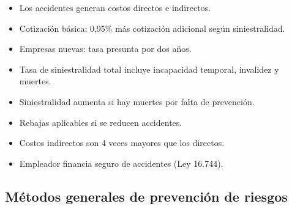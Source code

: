 \documentclass{article} %
\begin{document}
\begin{itemize}[label={},left=0pt,align=parleft]
    \item \begin{highlightbox}[levelone] Los accidentes generan costos directos e indirectos. \end{highlightbox}
    \item \begin{highlightbox}[levelone] Cotización básica: 0,95\% más cotización adicional según siniestralidad. \end{highlightbox}
    \item \begin{highlightbox}[levelone] Empresas nuevas: tasa presunta por dos años. \end{highlightbox}
    \item \begin{highlightbox}[levelone] Tasa de siniestralidad total incluye incapacidad temporal, invalidez y muertes. \end{highlightbox}
    \item \begin{highlightbox}[levelone] Siniestralidad aumenta si hay muertes por falta de prevención. \end{highlightbox}
    \item \begin{highlightbox}[levelone] Rebajas aplicables si se reducen accidentes. \end{highlightbox}
    \item \begin{highlightbox}[levelone] Costos indirectos son 4 veces mayores que los directos. \end{highlightbox}
    \item \begin{highlightbox}[levelone] Empleador financia seguro de accidentes (Ley 16.744). \end{highlightbox}
\end{itemize}

\subsection{Métodos generales de prevención de riesgos}
\end{document}

